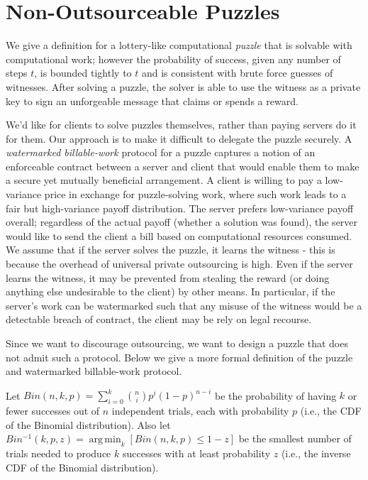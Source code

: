 \documentclass{article}
\DeclareMathOperator*{\argmin}{arg\,min}
\begin{document}
\section{Non-Outsourceable Puzzles}

We give a definition for a lottery-like computational {\em puzzle} that is solvable with computational work; however the probability of success, given any number of steps $t$, is bounded tightly to $t$ and is consistent with brute force guesses of witnesses. After solving a puzzle, the solver is able to use the witness as a private key to sign an unforgeable message that claims or spends a reward. 

We'd like for clients to solve puzzles themselves, rather than paying servers do it for them. Our approach is to make it difficult to delegate the puzzle securely. A {\em watermarked billable-work} protocol for a puzzle captures a notion of an enforceable contract between a server and client that would enable them to make a secure yet mutually beneficial arrangement. A client is willing to pay a low-variance price in exchange for puzzle-solving work, where such work leads to a fair but high-variance payoff distribution. The server prefers low-variance payoff overall; regardless of the actual payoff (whether a solution was found), the server would like to send the client a bill based on computational resources consumed. We assume that if the server solves the puzzle, it learns the witness - this is because the overhead of universal private outsourcing is high. Even if the server learns the witness, it may be prevented from stealing the reward (or doing anything else undesirable to the client) by other means. In particular, if the server's work can be watermarked such that any misuse of the witness would be a detectable breach of contract, the client may be rely on legal recourse.

Since we want to discourage outsourcing, we want to design a puzzle that does not admit such a protocol. Below we give a more formal definition of the puzzle and watermarked billable-work protocol.

Let $Bin(n,k,p) = \sum^k_{i=0}{n \choose i}p^i(1-p)^{n-i}$ be the probability of having $k$ or fewer successes out of $n$ independent trials, each with probability $p$ (i.e., the CDF of the Binomial distribution). Also let $Bin^{-1}(k,p,z) = \displaystyle{\argmin_k}\left[Bin(n,k,p) ≤ 1-z \right]$ be the smallest number of trials needed to produce $k$ successes with at least probability $z$ (i.e., the inverse CDF of the Binomial distribution).
\end{document}
